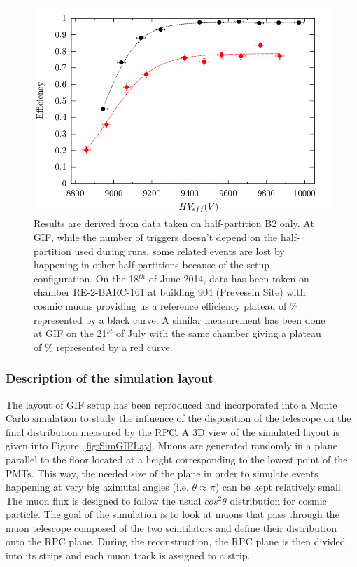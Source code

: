 		\begin{figure}[!h]
			\begin{center}
				\includegraphics[width = \plotwidth]{fig/Comparison.pdf}
			\end{center}
			\caption{\label{fig:EffCompar} Results are derived from data taken on half-partition B2 only. At GIF, while the number of triggers doesn't depend on the half-partition used during runs, some related events are lost by happening in other half-partitions because of the setup configuration. On the 18$^{th}$ of June 2014, data has been taken on chamber RE-2-BARC-161 at building 904 (Prevessin Site) with cosmic muons providing us a reference efficiency plateau of \% represented by a black curve. A similar measurement has been done at GIF on the 21$^{st}$ of July with the same chamber giving a plateau of \% represented by a red curve.}
		\end{figure}
		
		\subsubsection{Description of the simulation layout}
		\label{sssec:SimLayout}
		
			The layout of GIF setup has been reproduced and incorporated into a Monte Carlo simulation to study the influence of the disposition of the telescope on the final distribution measured by the RPC. A 3D view of the simulated layout is given into Figure~\ref{fig:SimGIFLay}. Muons are generated randomly in a plane parallel to the floor located at a height corresponding to the lowest point of the PMTs. This way, the needed size of the plane in order to simulate events happening at very big azimutal angles (i.e. $\theta\approx\pi$) can be kept relatively small. The muon flux is designed to follow the usual $cos^2\theta$ distribution for cosmic particle. The goal of the simulation is to look at muons that pass through the muon telescope composed of the two scintilators and define their distribution onto the RPC plane. During the reconstruction, the RPC plane is then divided into its strips and each muon track is assigned to a strip.
		
